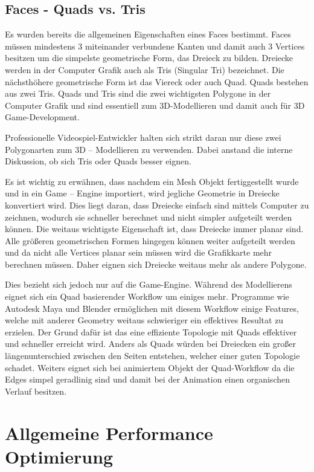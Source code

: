 \subsection{Faces - Quads vs. Tris}

Es wurden bereits die allgemeinen Eigenschaften eines Faces bestimmt. Faces müssen mindestens 3 miteinander verbundene Kanten und damit auch 3 Vertices besitzen um die simpelste geometrische Form, das Dreieck zu bilden. Dreiecke werden in der Computer Grafik auch als Tris (Singular Tri) bezeichnet. Die nächsthöhere geometrische Form ist das Viereck oder auch Quad. Quads bestehen aus zwei Tris. Quads und Tris sind die zwei wichtigsten Polygone in der Computer Grafik und sind essentiell zum 3D-Modellieren und damit auch für 3D Game-Development.

Professionelle Videospiel-Entwickler halten sich strikt daran nur diese zwei Polygonarten zum 3D – Modellieren zu verwenden. Dabei anstand die interne Diskussion, ob sich Tris oder Quads besser eignen.

Es ist wichtig zu erwähnen, dass nachdem ein Mesh Objekt fertiggestellt wurde und in ein Game – Engine importiert, wird jegliche Geometrie in Dreiecke konvertiert wird. Dies liegt daran, dass Dreiecke einfach sind mittels Computer zu zeichnen, wodurch sie schneller berechnet und nicht simpler aufgeteilt werden können. Die weitaus wichtigste Eigenschaft ist, dass Dreiecke immer planar sind. Alle größeren geometrischen Formen hingegen können weiter aufgeteilt werden und da nicht alle Vertices planar sein müssen wird die Grafikkarte mehr berechnen müssen. Daher eignen sich Dreiecke weitaus mehr als andere Polygone.

Dies bezieht sich jedoch nur auf die Game-Engine. Während des Modellierens eignet sich ein Quad basierender Workflow um einiges mehr. Programme wie Autodesk Maya und Blender ermöglichen mit diesem Workflow einige Features, welche mit anderer Geometry weitaus schwieriger ein effektives Resultat zu erzielen. Der Grund dafür ist das eine effiziente Topologie mit Quads effektiver und schneller erreicht wird. Anders als Quads würden bei Dreiecken ein großer längenunterschied zwischen den Seiten entstehen, welcher einer guten Topologie schadet. Weiters eignet sich bei animiertem Objekt der Quad-Workflow da die Edges simpel geradlinig sind und damit bei der Animation einen organischen Verlauf besitzen.

\section{Allgemeine Performance Optimierung}

